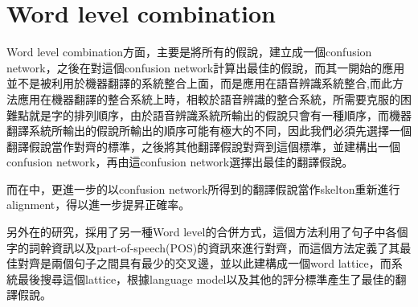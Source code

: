 \section{Word level combination}
\label{sec:Wlc}

Word level combination方面，主要是將所有的假說，建立成一個confusion network，之後在對這個confusion network計算出最佳的假說，而其一開始的應用並不是被利用於機器翻譯的系統整合上面，而是應用在語音辨識系統整合\cite{fiscus1997pps},而此方法應用在機器翻譯的整合系統上時，相較於語音辨識的整合系統，所需要克服的困難點就是字的排列順序，由於語音辨識系統所輸出的假說只會有一種順序，而機器翻譯系統所輸出的假說所輸出的順序可能有極大的不同，因此我們必須先選擇一個翻譯假說當作對齊的標準，之後將其他翻譯假說對齊到這個標準，並建構出一個confusion network，再由這confusion network選擇出最佳的翻譯假說\cite{bangalore2001cct}。


而在\cite{ayan2008iab}中，更進一步的以confusion network所得到的翻譯假說當作skelton重新進行alignment，得以進一步提昇正確率。


另外在\cite{jayaraman2005mem}的研究，採用了另一種Word level的合併方式，這個方法利用了句子中各個字的詞幹資訊以及part-of-speech(POS)的資訊來進行對齊，而這個方法定義了其最佳對齊是兩個句子之間具有最少的交叉邊，並以此建構成一個word lattice，而系統最後搜尋這個lattice，根據language model以及其他的評分標準產生了最佳的翻譯假說。











